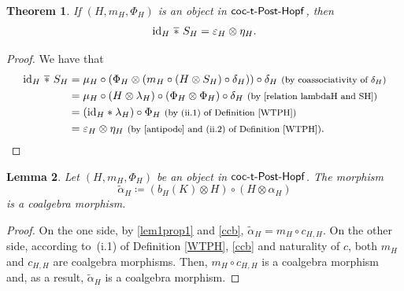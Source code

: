 \documentclass[pdftex]{sigma}
\numberwithin{equation}{section}
\newtheorem{Theorem}{Theorem}[section]
\newtheorem{Lemma}[Theorem]{Lemma}
 { \theoremstyle{definition}
\newtheorem{Definition}[Theorem]{Definition}
\newtheorem{Example}[Theorem]{Example}
\newtheorem{Remark}[Theorem]{Remark} }
\DeclareMathOperator{\barast}{\,\overline{\ast}\,}
\begin{document}
\begin{Theorem}
If $(H,m_{H},\Phi_{H})$ is an object in $\sf{coc}\textnormal{-}\sf{t}\textnormal{-}\sf{Post}\textnormal{-}\sf{Hopf}$, then
\begin{equation}\label{convolution one side}{\rm id}_{H}\barast S_{H}=\varepsilon_{H}\otimes\eta_{H}.\end{equation}
\end{Theorem}
\begin{proof} We have that
\begin{align*}
{\rm id}_{H}\barast S_{H}={}&\mu_{H}\circ(\Phi_{H}\otimes (m_{H}\circ(H\otimes S_{H})\circ\delta_{H}))\circ\delta_{H}\ \text{\footnotesize\textnormal{(by coassociativity of $\delta_{H}$)}}\\
={}&\mu_{H}\circ(H\otimes \lambda_{H})\circ(\Phi_{H}\otimes\Phi_{H})\circ\delta_{H}\ \text{\footnotesize\textnormal{(by \eqref{relation lambdaH and SH})}}\\
={}&({\rm id}_{H}\ast\lambda_{H})\circ\Phi_{H}\ \text{\footnotesize\textnormal{(by (ii.1) of Definition \ref{WTPH})}}\\
={}&\varepsilon_{H}\otimes\eta_{H}\ \text{\footnotesize\textnormal{(by \eqref{antipode} and (ii.2) of Definition \ref{WTPH})}}.\tag*{\qed}
\end{align*}
\renewcommand{\qed}{}
\end{proof}

\begin{Lemma}
Let $(H,m_{H},\Phi_{H})$ be an object in $\sf{coc}\textnormal{-}\sf{t}\textnormal{-}\sf{Post}\textnormal{-}\sf{Hopf}$. The morphism
\[\tilde{\alpha}_{H}\coloneqq \left( b_{H}(K)\otimes H\right)\circ(H\otimes\alpha_{H})\]
is a coalgebra morphism.
\end{Lemma}
\begin{proof}
On the one side, by \eqref{lem1prop1} and \eqref{ccb}, $\tilde{\alpha}_{H}=m_{H}\circ c_{H,H}$. On the other side, according to~(i.1) of Definition \ref{WTPH}, \eqref{ccb} and naturality of $c$, both $m_{H}$ and $c_{H,H}$ are coalgebra morphisms. Then, $m_{H}\circ c_{H,H}$ is a coalgebra morphism and, as a result, $\tilde{\alpha}_{H}$ is a coalgebra morphism.
\end{proof}
\end{document}
